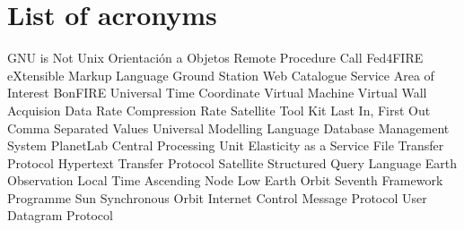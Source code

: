 \chapter{List of acronyms}

{\small
\begin{acronym}[XXXXXXXX]
       {\acs{GNU} is Not Unix}
        {Orientación a Objetos}
       {Remote Procedure Call}
       {Fed4FIRE}
      {eXtensible Markup Language}
      {Ground Station}
      {Web Catalogue Service}
     {Area of Interest}
      {BonFIRE}
    {Universal Time Coordinate}
     {Virtual Machine}
     {Virtual Wall}
    {Acquision Data Rate}
     {Compression Rate}
    {Satellite Tool Kit}
   {Last In, First Out}
    {Comma Separated Values}
    {Universal Modelling Language}
   {Database Management System}
     {PlanetLab}
    {Central Processing Unit}
   {Elasticity as a Service}
    {File Transfer Protocol}
   {Hypertext Transfer Protocol}
    {Satellite}
    {Structured Query Language}
  {Earth Observation}
  {Local Time Ascending Node}
  {Low Earth Orbit}
 {Seventh Framework Programme}
 {Sun Synchronous Orbit}
 {Internet Control Message Protocol}
 {User Datagram Protocol}
\end{acronym}
}




